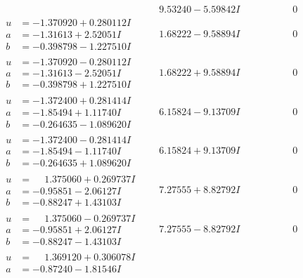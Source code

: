 \documentclass[1p]{elsarticle_modified}
\theoremstyle{definition}
\begin{document}
$$\begin{array}{c|c|c}
 & \phantom{-}9.53240 - 5.59842 I & \phantom{-0.000000 } 0 \\ \hline\begin{aligned}
u &= -1.370920 + 0.280112 I \\
a &= -1.31613 + 2.52051 I \\
b &= -0.398798 - 1.227510 I\end{aligned}
 & \phantom{-}1.68222 - 9.58894 I & \phantom{-0.000000 } 0 \\ \hline\begin{aligned}
u &= -1.370920 - 0.280112 I \\
a &= -1.31613 - 2.52051 I \\
b &= -0.398798 + 1.227510 I\end{aligned}
 & \phantom{-}1.68222 + 9.58894 I & \phantom{-0.000000 } 0 \\ \hline\begin{aligned}
u &= -1.372400 + 0.281414 I \\
a &= -1.85494 + 1.11740 I \\
b &= -0.264635 - 1.089620 I\end{aligned}
 & \phantom{-}6.15824 - 9.13709 I & \phantom{-0.000000 } 0 \\ \hline\begin{aligned}
u &= -1.372400 - 0.281414 I \\
a &= -1.85494 - 1.11740 I \\
b &= -0.264635 + 1.089620 I\end{aligned}
 & \phantom{-}6.15824 + 9.13709 I & \phantom{-0.000000 } 0 \\ \hline\begin{aligned}
u &= \phantom{-}1.375060 + 0.269737 I \\
a &= -0.95851 - 2.06127 I \\
b &= -0.88247 + 1.43103 I\end{aligned}
 & \phantom{-}7.27555 + 8.82792 I & \phantom{-0.000000 } 0 \\ \hline\begin{aligned}
u &= \phantom{-}1.375060 - 0.269737 I \\
a &= -0.95851 + 2.06127 I \\
b &= -0.88247 - 1.43103 I\end{aligned}
 & \phantom{-}7.27555 - 8.82792 I & \phantom{-0.000000 } 0 \\ \hline\begin{aligned}
u &= \phantom{-}1.369120 + 0.306078 I \\
a &= -0.87240 - 1.81546 I \\

\end{aligned}
\end{array}$$
\end{document}
